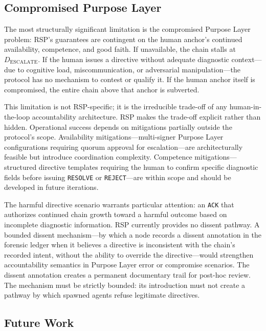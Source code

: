 \subsection{Compromised Purpose Layer}
\label{sec:rs-purpose-compromise}

The most structurally significant limitation is the compromised Purpose Layer problem: RSP's guarantees are contingent on the human anchor's continued availability, competence, and good faith. If unavailable, the chain stalls at $D_{\text{ESCALATE}}$. If the human issues a directive without adequate diagnostic context---due to cognitive load, miscommunication, or adversarial manipulation---the protocol has no mechanism to contest or qualify it. If the human anchor itself is compromised, the entire chain above that anchor is subverted.

This limitation is not RSP-specific; it is the irreducible trade-off of any human-in-the-loop accountability architecture. RSP makes the trade-off explicit rather than hidden. Operational success depends on mitigations partially outside the protocol's scope. Availability mitigations---multi-signer Purpose Layer configurations requiring quorum approval for escalation---are architecturally feasible but introduce coordination complexity. Competence mitigations---structured directive templates requiring the human to confirm specific diagnostic fields before issuing \texttt{RESOLVE} or \texttt{REJECT}---are within scope and should be developed in future iterations.

The harmful directive scenario warrants particular attention: an \texttt{ACK} that authorizes continued chain growth toward a harmful outcome based on incomplete diagnostic information. RSP currently provides no dissent pathway. A bounded dissent mechanism---by which a node records a dissent annotation in the forensic ledger when it believes a directive is inconsistent with the chain's recorded intent, without the ability to override the directive---would strengthen accountability semantics in Purpose Layer error or compromise scenarios. The dissent annotation creates a permanent documentary trail for post-hoc review. The mechanism must be strictly bounded: its introduction must not create a pathway by which spawned agents refuse legitimate directives.

\subsection{Future Work}
\label{sec:rs-future-work}

